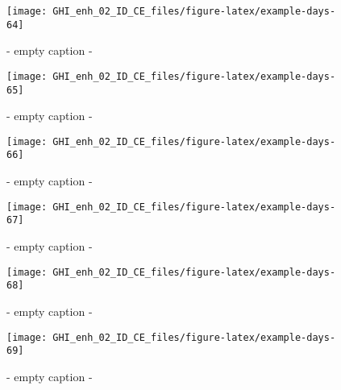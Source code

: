 \documentclass[
  10pt,
  a4paper,oneside]{article}
\begin{document}
\begin{figure}[H]

{\centering \texttt{[image: GHI\_enh\_02\_ID\_CE\_files/figure-latex/example-days-64]} 

}

\caption{ - empty caption - }\label{fig:example-days-64}
\end{figure}

\begin{figure}[H]

{\centering \texttt{[image: GHI\_enh\_02\_ID\_CE\_files/figure-latex/example-days-65]} 

}

\caption{ - empty caption - }\label{fig:example-days-65}
\end{figure}

\begin{figure}[H]

{\centering \texttt{[image: GHI\_enh\_02\_ID\_CE\_files/figure-latex/example-days-66]} 

}

\caption{ - empty caption - }\label{fig:example-days-66}
\end{figure}

\begin{figure}[H]

{\centering \texttt{[image: GHI\_enh\_02\_ID\_CE\_files/figure-latex/example-days-67]} 

}

\caption{ - empty caption - }\label{fig:example-days-67}
\end{figure}

\begin{figure}[H]

{\centering \texttt{[image: GHI\_enh\_02\_ID\_CE\_files/figure-latex/example-days-68]} 

}

\caption{ - empty caption - }\label{fig:example-days-68}
\end{figure}

\begin{figure}[H]

{\centering \texttt{[image: GHI\_enh\_02\_ID\_CE\_files/figure-latex/example-days-69]} 

}

\caption{ - empty caption - }\label{fig:example-days-69}
\end{figure}
\end{document}
